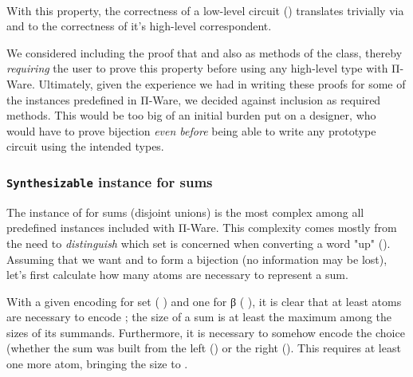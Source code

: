             \begin{center}
                 \AY{(} \AY{:} \AY{)}   \AY{(} \AY{)}  
                \\
                 \AY{(} \AY{:}  \AY{)}   \AY{(} \AY{)}  
            \end{center}

            With this property, the correctness of a low-level circuit () translates trivially
            via  and  to the correctness of it's high-level correspondent.

            We considered including the proof that  and  also as methods of the  class,
            thereby \emph{requiring} the user to prove this property before using any high-level type with Π-Ware.
            Ultimately, given the experience we had in writing these proofs for some of the  instances predefined
            in Π-Ware, we decided against inclusion as required methods.
            This would be too big of an initial burden put on a designer, who would have to prove bijection
            \emph{even before} being able to write any prototype circuit using the intended types.

            \subsubsection{\texttt{Synthesizable} instance for sums}
            \label{subsubsec:synthesizable-sums}
            The instance of  for sums (disjoint unions) is the most complex among all predefined
            instances included with Π-Ware.
            This complexity comes mostly from the need to \emph{distinguish} which set is concerned
            when converting a word "up" ().
            Assuming that we want  and  to form a bijection (no information may be lost),
            let's first calculate how many atoms are necessary to represent a sum.

            With a given encoding for set  ( \AY{:}   \AY{\{}\AY{\}})
            and one for β ( \AY{:}   \AY{\{}\AY{\}}),
            it is clear that at least    atoms are necessary to encode   ;
            the size of a sum is at least the maximum among the sizes of its summands.
            Furthermore, it is necessary to somehow encode the choice (whether the sum was built from
            the left () or the right (). This requires at least one more atom,
            bringing the size to  \AY{(}  \AY{)}.

